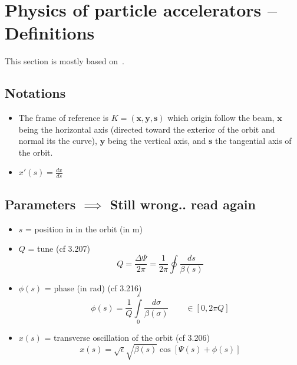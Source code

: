 \documentclass[12pt,a4paper]{article}
\author{\theauthor}
\title{\thetitle}
\begin{document}
	
\maketitle


\tableofcontents






\section{Physics of particle accelerators -- Definitions}
This section is mostly based on~\cite{book:wille}.

\subsection{Notations}
\begin{itemize}
	\item The frame of reference is $K = (\mathbf{x},\mathbf{y},\mathbf{s})$ which origin follow the beam, $\mathbf{x}$ being the horizontal axis (directed toward the exterior of the orbit and normal its the curve), $\mathbf{y}$ being the vertical axis, and $\mathbf{s}$ the tangential axis of the orbit.
	\item $x'(s) = \frac{dx}{ds}$
\end{itemize}

\subsection{Parameters $\implies$ Still wrong.. read again}
\begin{itemize}
	\item $s$ = position in in the orbit (in m)
	\item $Q$ = tune (cf 3.207)
	\begin{equation}
		Q = \frac{\Delta \Psi}{2 \pi}= \frac{1}{2 \pi} \oint \frac{ds}{\beta(s)}
	\end{equation}
	
	\item $\phi(s)$ = phase (in rad)  (cf 3.216)
	\begin{equation}
		\phi(s) = \frac{1}{Q} \int\limits_{0}^s \frac{d\sigma}{\beta(\sigma)} \qquad \in [0, 2 \pi Q]
	\end{equation}
	
	\item $x(s)$ = transverse oscillation of the orbit (cf 3.206) 
	\begin{equation}
		x(s) = \sqrt{\epsilon}\sqrt{\beta(s)}\cos[\Psi(s)+\phi(s)]
	\end{equation}
\end{itemize}
\end{document}
